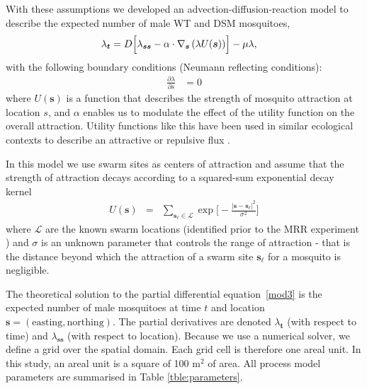 \documentclass[]{bmcart}
\newcommand{\vt}{\bm{t}}
\newcommand{\vs}{\bm{s}}
\newcommand{\va}{{\alpha}}
\newcommand{\vd}{{D}}
\newcommand{\vm}{{\mu}}
\begin{document}
With these assumptions we developed an advection-diffusion-reaction model to describe the expected number of male WT and DSM mosquitoes,
\begin{align}
\lambda_{\vt} &= \vd \Bigl[ \lambda_{\vs \vs}-\va \cdot \nabla_{\vs} \left( \lambda U(\vs)\right) \Bigr]-\vm \lambda, \label{mod3}
\end{align}
with the following boundary conditions (Neumann reflecting conditions):
\begin{align}
\frac{\partial \lambda}{\partial s} &= 0
\end{align}
where $U(\vs)$ is a function that describes the strength of mosquito attraction at location $s$, and $\va$ enables us to modulate the effect of the utility function on the overall attraction. Utility functions like this have been used in similar ecological contexts to describe an attractive or repulsive flux \citep{Moorcroft2008}.

In this model we use swarm sites as centers of attraction and assume that the strength of attraction decays according to a squared-sum exponential decay kernel
\begin{eqnarray}
U(\vs) &=& \sum_{\vs_\ell \in \mathcal{L}} \exp\Big[  - \frac{|\vs - \vs_\ell |^2}{\sigma^2}\Big]
\end{eqnarray}
where $\mathcal{L}$ are the known swarm locations (identified prior to the MRR experiment \citep{Epopa2017}) and $\sigma$ is an unknown parameter that controls the range of attraction - that is the distance beyond which the attraction of a swarm site $\vs_\ell$ for a mosquito is negligible. 

The theoretical solution to the partial differential equation~\ref{mod3} is the expected number of male mosquitoes at time $t$ and location $\vs=(\mathrm{easting},\mathrm{northing})$. The partial derivatives are denoted $\lambda_{\vt}$ (with respect to time) and $\lambda_{\vs \vs}$ (with respect to location). Because we use a numerical solver, we define a grid over the spatial domain. Each grid cell is therefore one areal unit. In this study, an areal unit is a square of 100 m$^2$ of area. All process model parameters are summarised in Table \ref{tble:parameters}.
\end{document}

